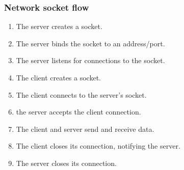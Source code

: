 \documentclass[10pt]{beamer}
\begin{document}
\begin{frame}
  \frametitle{Network socket flow}
  
   
  \begin{enumerate}
    \item The server creates a socket.
    \item The server binds the socket to an address/port.
    \item The server listens for connections to the socket.
    \item The client creates a socket.
    \item The client connects to the server's socket.
    \item the server accepts the client connection.
    \item The client and server send and receive data.
    \item The client closes its connection, notifying the server.
    \item The server closes its connection.
   \end{enumerate}
  
  
    
  \end{frame}
\end{document}
